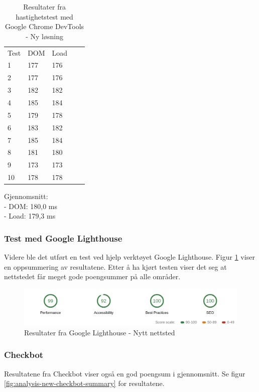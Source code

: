 \begin{table}[H]
\begin{center}
\begin{tabular}{lllll}
Test & DOM & Load &  &  \\
1 & 177 & 176 &  &  \\
2 & 177 & 176 &  &  \\
3 & 182 & 182 &  &  \\
4 & 185 & 184 &  &  \\
5 & 179 & 178 &  &  \\
6 & 183 & 182 &  &  \\
7 & 185 & 184 &  &  \\
8 & 181 & 180 &  &  \\
9 & 173 & 173 &  &  \\
10 & 178 & 178 &  &  \\
\end{tabular}
\end{center}
\caption{\label{tab:table-analysis-new-website}Resultater fra hastighetstest med Google Chrome DevTools - Ny løsning}
\end{table}

Gjennomsnitt:\\
- DOM: 180,0 ms\\
- Load: 179,3 ms

\subsubsection{Test med Google Lighthouse}
Videre ble det utført en test ved hjelp verktøyet Google Lighthouse. Figur \ref{fig:analysis-new-lightouse-summary} viser en oppsummering av resultatene. Etter å ha kjørt testen viser det seg at nettstedet får meget gode poengsummer på alle områder. 

\begin{figure}[H]
    \centering
    \includegraphics[width=\textwidth]{bjornar/Lighthouse-Report-mobile-new.png}
    \caption{Resultater fra Google Lighthouse - Nytt nettsted}
    \label{fig:analysis-new-lightouse-summary}
\end{figure}

\subsubsection{Checkbot}
Resultatene fra Checkbot viser også en god poengsum i gjennomsnitt. Se figur \ref{fig:analysis-new-checkbot-summary} for resultatene.

